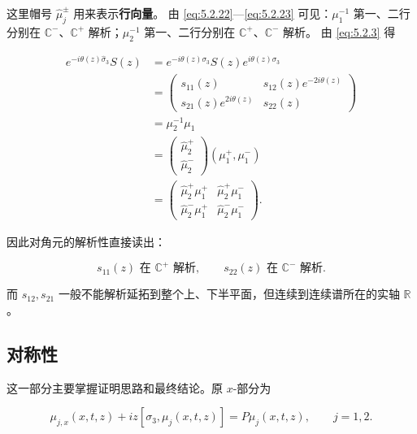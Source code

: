 \documentclass[
    lang=cn,
    scheme=chinese,
    mode=simple,
    device=normal,
    color=blue,
    math=cm,
    thmcnt=section,
    12pt,
    nowatermark
]{elegantbook}
\begin{document}
这里帽号 $\widehat\mu_j^\pm$ 用来表示\textbf{行向量}。
由 \eqref{eq:5.2.22}---\eqref{eq:5.2.23} 可见：$\mu_1^{-1}$ 第一、二行分别在 $\mathbb{C}^-$、$\mathbb{C}^+$ 解析；$\mu_2^{-1}$ 第一、二行分别在 $\mathbb{C}^+$、$\mathbb{C}^-$ 解析。
由 \eqref{eq:5.2.3} 得

\[
    \begin{aligned}
        e^{-i\theta(z)\widehat{\sigma}_3}S(z)
        & =
        e^{-i\theta(z)\sigma_3}S(z)e^{i\theta(z)\sigma_3} \\
        & =
        \begin{pmatrix}
            s_{11}(z) & s_{12}(z)e^{-2i\theta(z)} \\
            s_{21}(z)e^{2i\theta(z)} & s_{22}(z)
        \end{pmatrix} \\
        & =
        \mu_2^{-1}\mu_1 \\
        & =
        \begin{pmatrix}
            \widehat\mu_2^+ \\
            \widehat\mu_2^-
        \end{pmatrix}
        (\mu_1^+,\mu_1^-) \\
        & =
        \begin{pmatrix}
            \widehat\mu_2^+\mu_1^+ & \widehat\mu_2^+\mu_1^- \\
            \widehat\mu_2^-\mu_1^+ & \widehat\mu_2^-\mu_1^-
        \end{pmatrix}.
    \end{aligned}
\]

因此对角元的解析性直接读出：

\[
    s_{11}(z)\text{ 在 }\mathbb{C}^+\text{ 解析},
    \qquad
    s_{22}(z)\text{ 在 }\mathbb{C}^-\text{ 解析}.
\]

而 $s_{12},s_{21}$ 一般不能解析延拓到整个上、下半平面，但连续到连续谱所在的实轴 $\mathbb{R}$。

\subsection{对称性}

这一部分主要掌握证明思路和最终结论。原 $x$-部分为

\begin{equation}
    \mu_{j,x}(x,t,z)
    +
    iz[\sigma_3,\mu_j(x,t,z)]
    =
    P\mu_j(x,t,z),
    \qquad j=1,2.
    \tag{5.2.24}
    \label{eq:5.2.24}
\end{equation}
\end{document}
